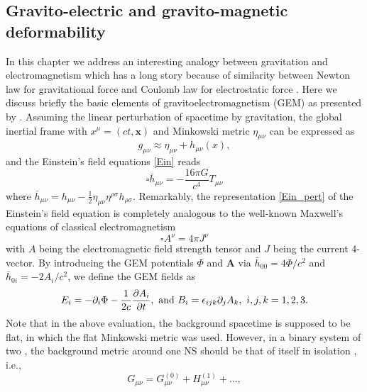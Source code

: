 \subsection{Gravito-electric and gravito-magnetic deformability}%
\label{sec3.2}
In this chapter we address an interesting analogy between gravitation and electromagnetism
which has a long story because of similarity between Newton law for gravitational 
force and Coulomb law for electrostatic force \citep{carroll2019spacetime}.
Here we discuss briefly the basic elements of gravitoelectromagnetism (\gls{GEM}) as 
presented by \cite{damour2009relativistic}. Assuming the linear perturbation of spacetime
by gravitation, the global inertial frame with $x^{\mu} = (ct, \mathbf{x})$ and 
Minkowski metric $\eta_{\mu\nu}$ can be expressed as
\begin{equation}
    g_{\mu\nu} \approx \eta_{\mu\nu} + h_{\mu\nu}(x),
\end{equation}
and the Einstein's field equations \eqref{Ein} reads
\begin{equation}
  \square \bar{h}_{\mu\nu} = - \frac{16\pi G}{c^4} T_{\mu\nu} \label{Ein_pert}
\end{equation}
where $\bar{h}_{\mu\nu}=h_{\mu\nu}-\frac{1}{2}\eta_{\mu\nu}\eta^{\rho\sigma}h_{\rho\sigma}$. Remarkably, the representation \eqref{Ein_pert} of the Einstein's field equation is 
completely analogous to the well-known Maxwell's equations of classical electromagnetism
\begin{equation}
    \square A^\nu = 4\pi J^\nu
\end{equation}
with $A$ being the electromagnetic field strength tensor and $J$ being the current 
4-vector. By introducing the \gls{GEM} potentials $\Phi$ and $\mathbf{A}$ via 
$\bar{h}_{00}=4\Phi/c^2$ and $\bar{h}_{0i} = -2A_i/c^2$, we define the \gls{GEM} fields as
\begin{equation}
E_{i} = -\partial_i\Phi - \frac{1}{2c}\pdv{A_i}{t},\ {\rm and}\ 
B_i = \epsilon_{ijk}\partial_j A_k,\ i,j,k=1,2,3. \label{eq3.9}
\end{equation}
Note that in the above evaluation, the background spacetime is supposed to be flat, 
in which the flat Minkowski metric was used. However, in a binary system of two , 
the background metric around one \gls{NS} should be that of itself in isolation 
\citep{damour2009relativistic}, i.e., 
\begin{equation}
    G_{\mu\nu} = G^{(0)}_{\mu\nu} + H^{(1)}_{\mu\nu} + \ldots, \label{eq3.10} 
\end{equation}
